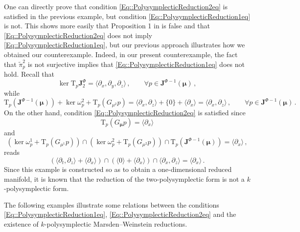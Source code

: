 \documentclass[11pt]{article}
\theoremstyle{plain}
\theoremstyle{definition}
\newcommand{\T}{\mathrm{T}}
\numberwithin{equation}{section}
\begin{document}
One can directly prove that condition \eqref{Eq::PolysymplecticReduction2eq} is satisfied in the previous example, but condition \eqref{Eq::PolysymplecticReduction1eq} is not. This shows more easily that Proposition 1 in \cite{GM_23} is false and  that \eqref{Eq::PolysymplecticReduction2eq} does not imply \eqref{Eq::PolysymplecticReduction1eq}, but our previous approach illustrates how we obtained our counterexample. Indeed, in our present counterexample, the fact that $\widetilde{\pi}_p^2$ is not surjective implies that \eqref{Eq::PolysymplecticReduction1eq} does not hold. Recall that 
$$
    \ker \T_p\mathbf{J}^\Phi_2=\langle \partial_x,\partial_y,\partial_z\rangle\,,\qquad \forall p\in \mathbf{J}^{\Phi-1}(\bm\mu)\,,
$$
while 
$$
    \T_p(\mathbf{J}^{\Phi-1}(\bm\mu)) + \ker\omega^2_p + \T_p(G_{\mu^2}p) = \langle \partial_x,\partial_z\rangle+\{0\}+\langle \partial_x\rangle = \langle \partial_x,\partial_z\rangle \,,\qquad \forall p\in \mathbf{J}^{\Phi-1}(\bm\mu)\,.
$$
On the other hand, condition \eqref{Eq::PolysymplecticReduction2eq} is satisfied since
$$
    \T_p(G_{\bm\mu} p) = \langle \partial_x\rangle
$$
and
$$
    (\ker \omega_p^1 + \T_p(G_{\mu^1}p))\cap(\ker \omega_p^2 + \T_p(G_{\mu^2}p))\cap  \T_p(\mathbf{J}^{\Phi-1}(\bm\mu)) = \langle \partial_x\rangle\,,
$$
reads
$$
(\langle \partial_t,\partial_z\rangle +\langle \partial_x\rangle)\cap (\langle 0 \rangle +\langle \partial_x\rangle)\cap \langle \partial_x,\partial_z\rangle=\langle \partial_x\rangle\,.
$$
Since this example is constructed so as to obtain a one-dimensional reduced manifold, it is known that the reduction of the two-polysymplectic form is not a $k$-polysymplectic form.


The following examples illustrate some relations between the conditions \eqref{Eq::PolysymplecticReduction1eq}, \eqref{Eq::PolysymplecticReduction2eq}
and the existence of $k$-polysymplectic Marsden--Weinstein reductions.
\end{document}
